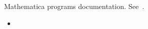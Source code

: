 Mathematica programs documentation.
See~\cite{kolosov2024identities}.
\begin{itemize}
    \item
\end{itemize}
